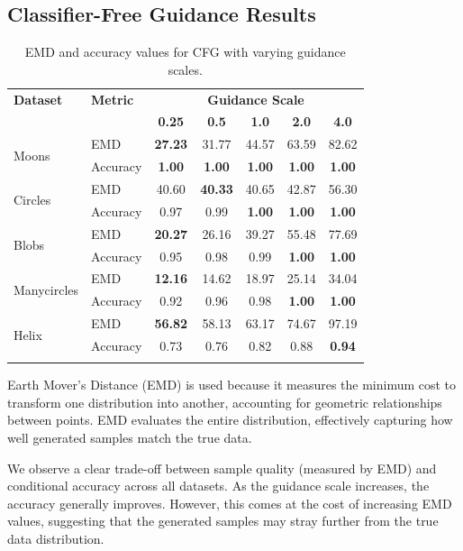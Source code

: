 \documentclass[11pt]{article}
\begin{document}
\newpage

\subsection{Classifier-Free Guidance Results}

\begin{longtable}{|l|l|c|c|c|c|c|}
    \hline
    \textbf{Dataset} & \textbf{Metric} & \multicolumn{5}{c|}{\textbf{Guidance Scale}} \\
    \cline{3-7}
    & & \textbf{0.25} & \textbf{0.5} & \textbf{1.0} & \textbf{2.0} & \textbf{4.0} \\
    \hline
    \multirow{2}{*}{Moons} & EMD & \textbf{27.23} & 31.77 & 44.57 & 63.59 & 82.62 \\
    \cline{2-7}
    & Accuracy & \textbf{1.00} & \textbf{1.00} & \textbf{1.00} & \textbf{1.00} & \textbf{1.00} \\
    \hline
    \multirow{2}{*}{Circles} & EMD & 40.60 & \textbf{40.33} & 40.65 & 42.87 & 56.30 \\
    \cline{2-7}
    & Accuracy & 0.97 & 0.99 & \textbf{1.00} & \textbf{1.00} & \textbf{1.00} \\
    \hline
    \multirow{2}{*}{Blobs} & EMD & \textbf{20.27} & 26.16 & 39.27 & 55.48 & 77.69 \\
    \cline{2-7}
    & Accuracy & 0.95 & 0.98 & 0.99 & \textbf{1.00} & \textbf{1.00} \\
    \hline
    \multirow{2}{*}{Manycircles} & EMD & \textbf{12.16} & 14.62 & 18.97 & 25.14 & 34.04 \\
    \cline{2-7}
    & Accuracy & 0.92 & 0.96 & 0.98 & \textbf{1.00} & \textbf{1.00} \\
    \hline
    \multirow{2}{*}{Helix} & EMD & \textbf{56.82} & 58.13 & 63.17 & 74.67 & 97.19 \\
    \cline{2-7}
    & Accuracy & 0.73 & 0.76 & 0.82 & 0.88 & \textbf{0.94} \\
    \hline
    \caption{EMD and accuracy values for CFG with varying guidance scales.}
\end{longtable}
\label{tab:cfg_results}

Earth Mover's Distance (EMD) is used because it measures the minimum cost to transform one distribution into another, accounting for geometric relationships between points. EMD evaluates the entire distribution, effectively capturing how well generated samples match the true data.

We observe a clear trade-off between sample quality (measured by EMD) and conditional accuracy across all datasets. As the guidance scale increases, the accuracy generally improves. However, this comes at the cost of increasing EMD values, suggesting that the generated samples may stray further from the true data distribution.
\end{document}
